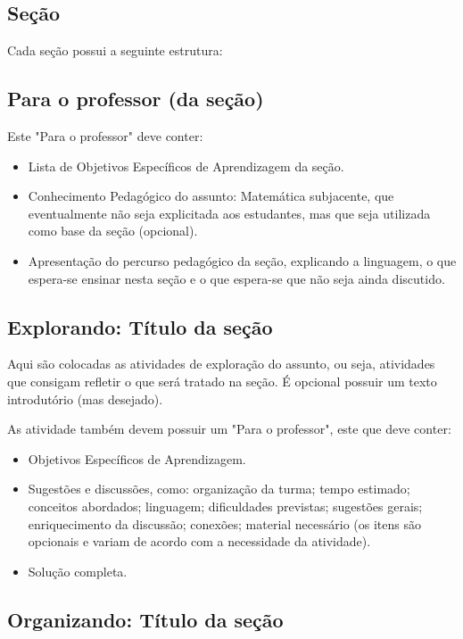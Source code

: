 \subsection{Seção}

Cada seção possui a seguinte estrutura:

\subsection{Para o professor (da seção)}
Este "Para o professor"{} deve conter:
\begin{itemize}
\item Lista de Objetivos Específicos de Aprendizagem da seção.
\item Conhecimento Pedagógico do assunto: Matemática subjacente, que eventualmente não seja explicitada aos estudantes, mas que seja utilizada como base da seção (opcional).
\item Apresentação do percurso pedagógico da seção, explicando a linguagem, o que espera-se ensinar nesta seção e o que espera-se que não seja ainda discutido.
\end{itemize}

\def\currentcolor{session1}
\subsection{Explorando: Título da seção}

Aqui são colocadas as atividades de exploração do assunto, ou seja, atividades que consigam refletir o que será tratado na seção. É opcional possuir um texto introdutório (mas desejado).

As atividade também devem possuir um "Para o professor", este que deve conter:
\begin{itemize}
\item Objetivos Específicos de Aprendizagem.
\item Sugestões e discussões, como: organização da turma; tempo estimado; conceitos abordados; linguagem; dificuldades previstas; sugestões gerais; enriquecimento da discussão; conexões; material necessário (os itens são opcionais e variam de acordo com a necessidade da atividade).
\item Solução completa.
\end{itemize}

\def\currentcolor{session4}
\subsection{Organizando: Título da seção}

